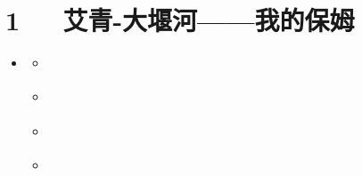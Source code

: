 \documentclass[letterpaper,12pt,english]{sphinxmanual}
\begin{document}
\chapter{1   艾青-大堰河——我的保姆}
\label{\detokenize{p01_u6563_u6587/_u827e_u9752-_u5927_u5830_u6cb3_u2014_u2014_u6211_u7684_u4fdd_u59c6:id1}}\label{\detokenize{p01_u6563_u6587/_u827e_u9752-_u5927_u5830_u6cb3_u2014_u2014_u6211_u7684_u4fdd_u59c6::doc}}
\begin{sphinxShadowBox}
\begin{itemize}
\item {} 
\label{\detokenize{p01_u6563_u6587/_u827e_u9752-_u5927_u5830_u6cb3_u2014_u2014_u6211_u7684_u4fdd_u59c6:id7}}{\hyperref[\detokenize{p01_u6563_u6587/_u827e_u9752-_u5927_u5830_u6cb3_u2014_u2014_u6211_u7684_u4fdd_u59c6:id1}]{}}
\begin{itemize}
\item {} 
\label{\detokenize{p01_u6563_u6587/_u827e_u9752-_u5927_u5830_u6cb3_u2014_u2014_u6211_u7684_u4fdd_u59c6:id8}}{\hyperref[\detokenize{p01_u6563_u6587/_u827e_u9752-_u5927_u5830_u6cb3_u2014_u2014_u6211_u7684_u4fdd_u59c6:id3}]{}}

\item {} 
\label{\detokenize{p01_u6563_u6587/_u827e_u9752-_u5927_u5830_u6cb3_u2014_u2014_u6211_u7684_u4fdd_u59c6:id9}}{\hyperref[\detokenize{p01_u6563_u6587/_u827e_u9752-_u5927_u5830_u6cb3_u2014_u2014_u6211_u7684_u4fdd_u59c6:id4}]{}}

\item {} 
\label{\detokenize{p01_u6563_u6587/_u827e_u9752-_u5927_u5830_u6cb3_u2014_u2014_u6211_u7684_u4fdd_u59c6:id10}}{\hyperref[\detokenize{p01_u6563_u6587/_u827e_u9752-_u5927_u5830_u6cb3_u2014_u2014_u6211_u7684_u4fdd_u59c6:id5}]{}}

\item {} 
\label{\detokenize{p01_u6563_u6587/_u827e_u9752-_u5927_u5830_u6cb3_u2014_u2014_u6211_u7684_u4fdd_u59c6:id11}}{\hyperref[\detokenize{p01_u6563_u6587/_u827e_u9752-_u5927_u5830_u6cb3_u2014_u2014_u6211_u7684_u4fdd_u59c6:id6}]{}}

\end{itemize}

\end{itemize}
\end{sphinxShadowBox}
\end{document}
